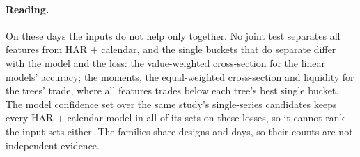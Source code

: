 \paragraph{Reading.} On these \bkDays{} days the inputs do not help only together. No joint
test separates all features from HAR + calendar, and the single buckets that do separate
differ with the model and the loss: the value-weighted cross-section for the linear models'
accuracy; the moments, the equal-weighted cross-section and liquidity for the trees' trade,
where all features trades below each tree's best single bucket. The model confidence set
over the same study's \bkMcsN{} single-series candidates keeps every HAR + calendar model in
all \bkMcsSets{} of its sets on these losses, so it cannot rank the input sets either. The
families share designs and days, so their counts are not independent evidence.

\begin{table}[H]
\centering
\caption{The bucket story check by family, on \bkDays{} days. QLIKE: all features against
HAR + calendar (change of the mean in \%, DM; negative = all features better) and the
add-bucket design with the most negative DM. Trade: the $\mathrm{sign}(s)$ Sharpe ratio at
the midpoint of HAR + calendar, of all features (in parentheses the HAC $t$ of the
difference to HAR + calendar) and of the add-bucket design with the largest HAC $t$.
StepM: designs named at a family-wise rate of \bkFwer\,\% at every block length --- A, the
bucket added to HAR + calendar beats it; B, removing it from all features helps; C, removing
it hurts --- on QLIKE (Q), winsorized QLIKE (Q$_w$) or the trade loss (T); all features is
never named. Pools average each design's daily loss and P\&L over their estimators.}
\label{tab:app_buckets}
\resizebox{\textwidth}{!}{\scriptsize\setlength{\tabcolsep}{2.4pt}}
\end{table}
